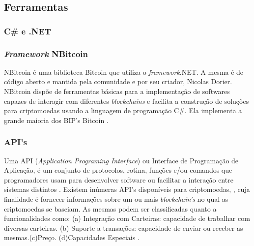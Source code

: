 \documentclass[
	article,			%
	11pt,				%
	oneside,			%
	a4paper,			%
	chapter=TITLE,		%
	section=TITLE,		%
	subsection=TITLE,	%
	subsubsection=TITLE, %
	english,			%
	brazil,				%
	sumario=tradicional
	]{ifrs-artigo-abntex2}
\begin{document}
\subsection{Ferramentas}

\subsubsection{C{\#} e .NET}

\subsubsection{\textit{Framework} NBitcoin}
NBitcoin é uma biblioteca Bitcoin que utiliza o \textit{framework}.NET. A mesma é de código aberto e mantida pela comunidade e por seu criador, Nicolas Dorier. NBitcoin dispõe de ferramentas básicas para a implementação de softwares capazes de interagir com diferentes \textit{blockchains} e facilita a construção de soluções para criptomoedas usando a linguagem de programação C{\#}. Ela implementa a grande maioria dos BIP’s Bitcoin \cite{heHenry2018}.

\subsubsection{API's}
Uma API (\textit{Application Programing Interface}) ou Interface de Programação de Aplicação, é um conjunto de protocolos, rotina, funções e/ou comandos que programadores usam para desenvolver software ou facilitar a interação entre sistemas distintos \cite{techoAPI2018}. Existem inúmeras API’s disponíveis para criptomoedas, , cuja finalidade é fornecer informações sobre um ou mais \textit{blockchain’s} no qual as criptomoedas se baseiam. As mesmas podem ser classificadas quanto a  funcionalidades como: (a) Integração com Carteiras: capacidade de trabalhar com diversas carteiras. (b) Suporte a transações: capacidade de enviar ou receber as mesmas.(c)Preço. (d)Capacidades Especiais \cite{lastcAPIS}.
\end{document}
